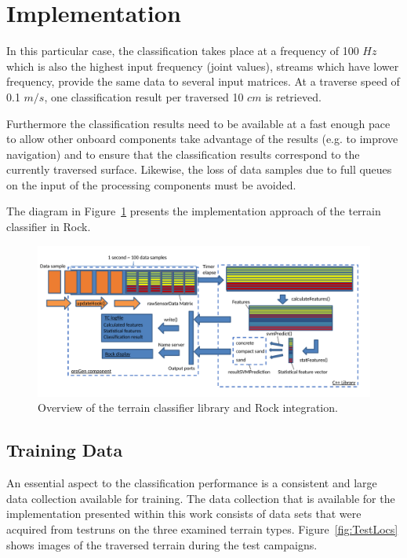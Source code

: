 \documentclass{article}
\begin{document}
\section{Implementation}
In this particular case, the classification takes place at a frequency of 100 $Hz$ which is also the highest input frequency (joint values), streams which have lower frequency, provide the same data to several input matrices. At a traverse speed of 0.1 $m/s$, one classification result per traversed 10 $cm$ is retrieved. 

Furthermore the classification results need to be available at a fast enough pace to allow other onboard components take advantage of the results (e.g. to improve navigation) and to ensure that the classification results correspond to the currently traversed surface. 
Likewise, the loss of data samples due to full queues on the input of the processing components must be avoided. 

The diagram in Figure~\ref{fig:overview} presents the implementation approach of the terrain classifier in Rock.

\begin{figure}[h]
\centering
\includegraphics[width=\textwidth]{../figures/OverviewTC2.pdf}
\caption{\label{fig:overview}Overview of the terrain classifier library and Rock integration.}
\end{figure}

\subsection{Training Data}

An essential aspect to the classification performance is a consistent and large data collection available for training. The data collection that is available for the implementation presented within this work consists of data sets that were acquired from testruns on the three examined terrain types. Figure~\ref{fig:TestLocs} shows images of the traversed terrain during the test campaigns.
\end{document}
